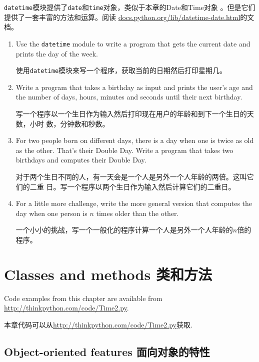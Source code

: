 \documentclass[10pt]{book}
\begin{document}
\begin{CJK}{UTF8}{gbsn}
\begin{exercise}
{\tt datetime}模块提供了{\tt date}和{\tt time}对象，类似于本章的Date和Time对象
。但是它们提供了一套丰富的方法和运算。阅读
\url{docs.python.org/lib/datetime-date.html}的文档。

\begin{enumerate}

\item Use the {\tt datetime} module to write a program that gets the
  current date and prints the day of the week.

使用{\tt datetime}模块来写一个程序，获取当前的日期然后打印星期几。

\item Write a program that takes a birthday as input and prints the
  user's age and the number of days, hours, minutes and seconds until
  their next birthday.

  写一个程序以一个生日作为输入然后打印现在用户的年龄和到下一个生日的天数，小时
  数，分钟数和秒数。

\item For two people born on different days, there is a day when one
  is twice as old as the other. That's their Double Day.  Write a
  program that takes two birthdays and computes their Double Day.

  对于两个生日不同的人，有一天会是一个人是另外一个人年龄的两倍。这叫它们的二重
  日。写一个程序以两个生日作为输入然后计算它们的二重日。

\item For a little more challenge, write the more general version that
  computes the day when one person is $n$ times older than the other.

一个小小的挑战，写一个一般化的程序计算一个人是另外一个人年龄的$n$倍的程序。

\end{enumerate}

\end{exercise}


\chapter{Classes and methods 类和方法}

Code examples from this chapter are available from
\url{http://thinkpython.com/code/Time2.py}.

本章代码可以从\url{http://thinkpython.com/code/Time2.py}获取.

\section{Object-oriented features 面向对象的特性}


\end{CJK}
\end{document}
